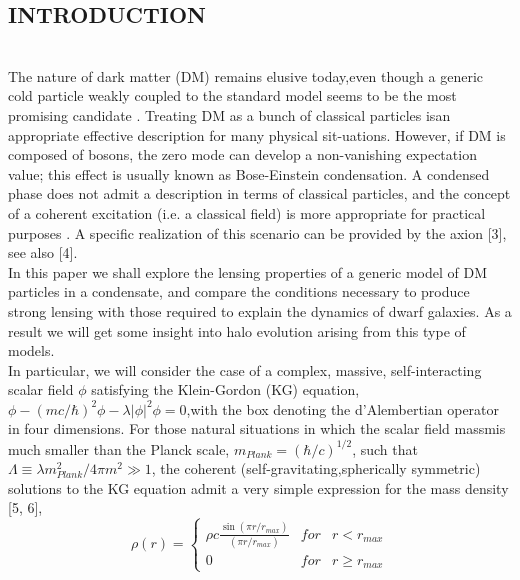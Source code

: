 \documentclass[10pt]{article}
\begin{document}
\begin{multicols}{2}
\section{\large \centering INTRODUCTION}\\

The nature of dark matter (DM) remains elusive today,even though a generic cold particle weakly coupled to the standard model seems to be the most promising candidate \cite{Bertone_2005}.  Treating DM as a bunch of classical particles isan appropriate effective description for many physical sit-uations.  However, if DM is composed of bosons, the zero mode can develop a non-vanishing expectation value; this effect is usually known as Bose-Einstein condensation.  A condensed phase does not admit a description in terms of classical particles, and the concept of a coherent excitation (i.e.  a classical field) is more appropriate for practical purposes \cite{PhysRevD.28.1243}.  A specific realization of this scenario can be provided by the axion [3], see also [4].\\
In  this  paper  we  shall  explore  the  lensing  properties of a generic model of DM particles in a condensate, and compare the conditions necessary to produce strong lensing with those required to explain the dynamics of dwarf galaxies.  As a result we will get some insight into halo evolution arising from this type of models.\\
In  particular,  we  will  consider  the  case  of  a  complex,  massive,  self-interacting  scalar  field \(\phi \) satisfying the  Klein-Gordon (KG) equation, \(\phi - (mc/\hbar)^2 \phi - \lambda|\phi|^2\phi = 0\),with  the  box  denoting  the  d’Alembertian operator  in  four  dimensions.   For  those  natural  situations  in  which  the  scalar  field  massmis  much  smaller than  the  Planck  scale, \(m_{Plank}=(\hbar/c)^{1/2}\), such that \(\Lambda\equiv\lambda m_{Plank}^{2}/4\pi m^{2}\gg1\), the coherent (self-gravitating,spherically symmetric) solutions to the KG equation admit a very simple expression for the mass density [5, 6], 
\begin{equation} \label{eq:1}
		\rho(r)= \left\{ \begin{array}{lcc}
		\rho c\frac{\sin(\pi r/r_{max})}{(\pi r/r_{max})} 
		&   for  &   r< r_{max}
		\\ 0 &  for & r\geq r_{max} 
	\end{array} \right. 
\end{equation}


\end{multicols}
\end{document}
